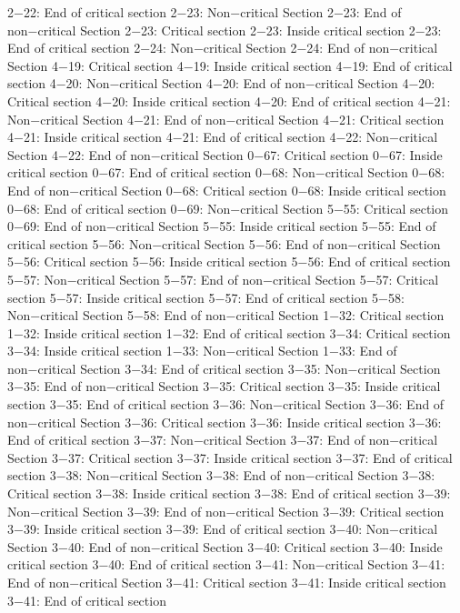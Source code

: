 2−22: End of critical section
2−23: Non−critical Section
2−23: End of non−critical Section
2−23: Critical section
2−23: Inside critical section
2−23: End of critical section
2−24: Non−critical Section
2−24: End of non−critical Section
4−19: Critical section
4−19: Inside critical section
4−19: End of critical section
4−20: Non−critical Section
4−20: End of non−critical Section
4−20: Critical section
4−20: Inside critical section
4−20: End of critical section
4−21: Non−critical Section
4−21: End of non−critical Section
4−21: Critical section
4−21: Inside critical section
4−21: End of critical section
4−22: Non−critical Section
4−22: End of non−critical Section
0−67: Critical section
0−67: Inside critical section
0−67: End of critical section
0−68: Non−critical Section
0−68: End of non−critical Section
0−68: Critical section
0−68: Inside critical section
0−68: End of critical section
0−69: Non−critical Section
5−55: Critical section
0−69: End of non−critical Section
5−55: Inside critical section
5−55: End of critical section
5−56: Non−critical Section
5−56: End of non−critical Section
5−56: Critical section
5−56: Inside critical section
5−56: End of critical section
5−57: Non−critical Section
5−57: End of non−critical Section
5−57: Critical section
5−57: Inside critical section
5−57: End of critical section
5−58: Non−critical Section
5−58: End of non−critical Section
1−32: Critical section
1−32: Inside critical section
1−32: End of critical section
3−34: Critical section
3−34: Inside critical section
1−33: Non−critical Section
1−33: End of non−critical Section
3−34: End of critical section
3−35: Non−critical Section
3−35: End of non−critical Section
3−35: Critical section
3−35: Inside critical section
3−35: End of critical section
3−36: Non−critical Section
3−36: End of non−critical Section
3−36: Critical section
3−36: Inside critical section
3−36: End of critical section
3−37: Non−critical Section
3−37: End of non−critical Section
3−37: Critical section
3−37: Inside critical section
3−37: End of critical section
3−38: Non−critical Section
3−38: End of non−critical Section
3−38: Critical section
3−38: Inside critical section
3−38: End of critical section
3−39: Non−critical Section
3−39: End of non−critical Section
3−39: Critical section
3−39: Inside critical section
3−39: End of critical section
3−40: Non−critical Section
3−40: End of non−critical Section
3−40: Critical section
3−40: Inside critical section
3−40: End of critical section
3−41: Non−critical Section
3−41: End of non−critical Section
3−41: Critical section
3−41: Inside critical section
3−41: End of critical section
